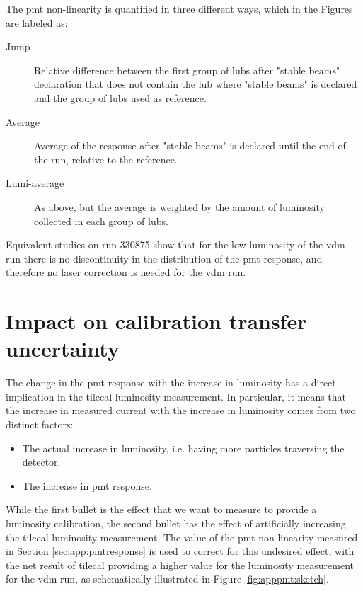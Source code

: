 The \gls{pmt} non-linearity is quantified in three different ways, which in the Figures are labeled as:
\begin{description}
\item[Jump] Relative difference between the first group of \glspl{lub} after "stable beams" declaration that does not contain the 
\gls{lub} where "stable beams" is declared and the group of \glspl{lub} used as reference.
\item[Average] Average of the response after "stable beams" is declared until the end of the run, relative to the reference.
\item[Lumi-average] As above, but the average is weighted by the amount of luminosity collected in each group of \glspl{lub}.
\end{description}

 Equivalent studies on run 330875 show that for the low luminosity of the \gls{vdm} run there is no discontinuity in the 
 distribution of the \gls{pmt} response, and therefore no laser correction is needed for the \gls{vdm} run. 

\FloatBarrier


\section{Impact on calibration transfer uncertainty}

The change in the \gls{pmt} response with the increase in luminosity has a direct implication in the 
\gls{tilecal} luminosity measurement. 
In particular, it means that the increase in measured current with the increase in luminosity comes from 
two distinct factors:
\begin{itemize}
\item The actual increase in luminosity, i.e. having more particles traversing the detector.
\item The increase in \gls{pmt} response.
\end{itemize}

While the first bullet is the effect that we want to measure to provide a luminosity calibration, 
the second bullet has the effect of artificially increasing the \gls{tilecal} 
luminosity measurement. The value of the \gls{pmt} non-linearity measured in Section \ref{sec:app:pmtresponse} 
is used to correct for this undesired effect, with the net result of \gls{tilecal} providing a higher value 
for the luminosity measurement for the \gls{vdm} run, as schematically illustrated in Figure \ref{fig:apppmt:sketch}.


